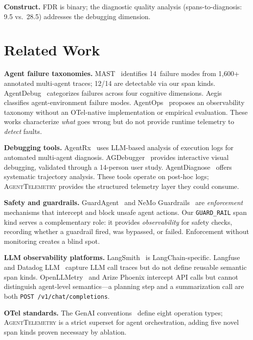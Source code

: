 \documentclass[11pt]{article}
\begin{document}
\textbf{Construct.}  FDR is binary; the diagnostic quality analysis
(spans-to-diagnosis: 9.5 vs.\ 28.5) addresses the debugging dimension.

\section{Related Work}
\label{sec:related}

\textbf{Agent failure taxonomies.}
MAST~\citep{mast} identifies 14~failure modes from 1,600+ annotated
multi-agent traces; 12/14 are detectable via our span kinds.
AgentDebug~\citep{agentdebug} categorizes failures across four
cognitive dimensions.  Aegis~\citep{aegis} classifies agent-environment
failure modes.  AgentOps~\citep{agentops} proposes an observability
taxonomy without an OTel-native implementation or empirical evaluation.
These works characterize \emph{what} goes wrong but do not provide
runtime telemetry to \emph{detect} faults.

\textbf{Debugging tools.}
AgentRx~\citep{agentrx} uses LLM-based analysis of execution logs for
automated multi-agent diagnosis.
AGDebugger~\citep{agdebugger} provides interactive visual debugging,
validated through a 14-person user study.
AgentDiagnose~\citep{agentdiagnose} offers systematic trajectory
analysis.  These tools operate on post-hoc logs;
\textsc{AgentTelemetry} provides the structured telemetry layer they
could consume.

\textbf{Safety and guardrails.}
GuardAgent~\citep{guardagent} and NeMo Guardrails~\citep{nemo_guardrails}
are \emph{enforcement} mechanisms that intercept and block unsafe agent
actions.  Our \texttt{GUARD\_RAIL} span kind serves a complementary
role: it provides \emph{observability} for safety checks, recording
whether a guardrail fired, was bypassed, or failed.  Enforcement
without monitoring creates a blind spot.

\textbf{LLM observability platforms.}
LangSmith~\citep{langsmith} is LangChain-specific.
Langfuse~\citep{langfuse} and Datadog LLM~\citep{datadog_llm} capture
LLM call traces but do not define reusable semantic span kinds.
OpenLLMetry~\citep{openllmetry} and Arize Phoenix intercept API calls
but cannot distinguish agent-level semantics---a planning step and a
summarization call are both \texttt{POST /v1/chat/completions}.

\textbf{OTel standards.}
The GenAI conventions~\citep{otel} define eight operation types;
\textsc{AgentTelemetry} is a strict superset for agent orchestration,
adding five novel span kinds proven necessary by ablation.
\end{document}
